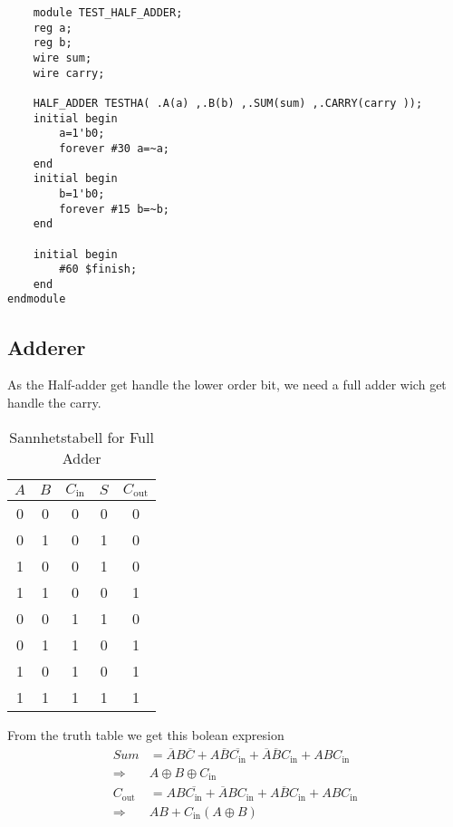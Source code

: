 \begin{lstlisting}
    module TEST_HALF_ADDER;
	reg a;
	reg b;
	wire sum;
	wire carry;
	
	HALF_ADDER TESTHA( .A(a) ,.B(b) ,.SUM(sum) ,.CARRY(carry ));
	initial begin
		a=1'b0;
		forever #30	a=~a;
	end	
	initial begin
		b=1'b0;
		forever #15	b=~b;
	end	
	
	initial begin
		#60 $finish;
	end	  
endmodule
\end{lstlisting}





\subsection{Adderer}
As the Half-adder get handle the lower order bit, we need a full adder wich get handle the carry. 
\begin{table}[H]
    \centering
    \begin{tabular}{|c|c|c|c|c|}
        \hline
        \(A\) & \(B\) & \(C_{\text{in}}\) & \(S\) & \(C_{\text{out}}\) \\
        \hline
        0 & 0 & 0 & 0 & 0 \\
        0 & 1 & 0 & 1 & 0 \\
        1 & 0 & 0 & 1 & 0 \\
        1 & 1 & 0 & 0 & 1 \\
        0 & 0 & 1 & 1 & 0 \\
        0 & 1 & 1 & 0 & 1 \\
        1 & 0 & 1 & 0 & 1 \\
        1 & 1 & 1 & 1 & 1 \\
        \hline
    \end{tabular}
    \caption{Sannhetstabell for Full Adder}
\end{table}
From the truth table we get this bolean expresion
\begin{equation}
    \begin{aligned}
        Sum&=\overline{A}B\overline{C}+A\overline{B}\overline{C_{\text{in}}}+\overline{A}\overline{B}C_{\text{in}}+ABC_{\text{in}}\\
        \Rightarrow&A\oplus B\oplus C_{\text{in}}\\
        C_{\text{out}}&=AB\overline{C_{\text{in}}}+\overline{A}BC_{\text{in}}+A\overline{B}C_{\text{in}}+ABC_{\text{in}}\\ 
        \Rightarrow&AB+C_{\text{in}}(A\oplus B)\\
    \end{aligned}
\end{equation}

